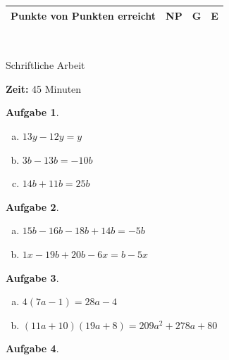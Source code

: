 \documentclass[12pt,fleqn]{article}
\theoremstyle{aufg}
\newtheorem{aufgabe}{Aufgabe}
\theoremstyle{bsp}
\begin{document}
 
    \begin{flushleft}
\renewcommand{\arraystretch}{2.15} 
\begin{tabular}{|p{10cm}|p{2cm}|p{2cm}|p{2cm}|} 
\hline 
\hspace{2cm} Punkte von \qquad30\qquad Punkten erreicht & \hspace{1.2cm} NP & G & E \\ 
\hline 
\end{tabular} \\[1em]    
\begin{center}{\Large Schriftliche Arbeit}\end{center} 
{\bf Zeit: }45 Minuten\\ 
\begin{aufgabe} ~ \\ 
\begin{multicols}{3} 
\begin{enumerate}[a)] 
\item 
$13y-12y=y$
\item 
$3b-13b=- 10 b$
\item 
$14b+11b=25 b$
\end{enumerate} 
\end{multicols} 
\end{aufgabe} 
\begin{aufgabe} ~ \\ 
\begin{multicols}{2} 
\begin{enumerate}[a)] 
\item 
$15b-16b-18b+14b=- 5 b$
\item 
$1x-19b+20b-6x=b - 5 x$
\end{enumerate} 
\end{multicols} 
\end{aufgabe} 
\begin{aufgabe} ~ \\ 
\begin{multicols}{2} 
\begin{enumerate}[a)] 
\item 
$4(7a-1)=28 a - 4$
\item 
$(11a+10)(19a+8)=209 a^{2} + 278 a + 80$
\end{enumerate} 
\end{multicols} 
\end{aufgabe} 
\begin{aufgabe} ~ \\ 
\begin{multicols}{3} 

\end{multicols}
\end{aufgabe}
\end{flushleft}
\end{document}
